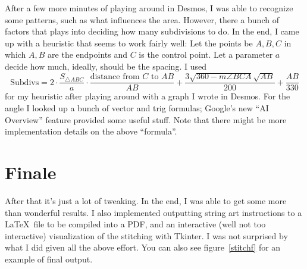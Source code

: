 \documentclass{article}
\begin{document}
	After a few more minutes of playing around in Desmos, I was able to recognize some patterns, such as what influences the area. However, there a bunch of factors that plays into deciding how many subdivisions to do. In the end, I came up with a heuristic that seems to work fairly well: Let the points be \(A,B,C\) in which \(A,B\) are the endpoints and \(C\) is the control point. Let a parameter \(a\) decide how much, ideally, should be the spacing. I used \[\mathrm{Subdivs}=2\cdot\frac{S_{\triangle ABC}}{a}\cdot\frac{\text{distance from }C\text{ to }AB}{AB}+\frac{3\sqrt{360-m\angle BCA}\sqrt{AB}}{200}+\frac{AB}{330}\]
	for my heuristic after playing around with a graph I wrote in Desmos. For the angle I looked up a bunch of vector and trig formulas; Google's new ``AI Overview'' feature provided some useful stuff. Note that there might be more implementation details on the above ``formula''.
	
	\section{Finale}
	After that it's just a lot of tweaking. In the end, I was able to get some more than wonderful results. I also implemented outputting string art instructions to a \LaTeX\ file to be compiled into a PDF, and an interactive (well not too interactive) visualization of the stitching with Tkinter. I was not surprised by what I did given all the above effort. You can also see figure~\ref{stitchf} for an example of final output.
\end{document}
